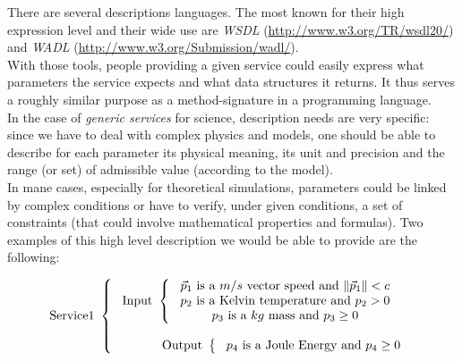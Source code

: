 \documentclass[a4paper,11pt] {article}
\begin{document}
There are several descriptions languages. The most known for their high expression level and their wide use are \emph{WSDL} (\href{http://www.w3.org/TR/wsdl20/}{http://www.w3.org/TR/wsdl20/}) and \textit{WADL} (\href{http://www.w3.org/Submission/wadl/}{http://www.w3.org/Submission/wadl/}).\\
With those tools, people providing a given service could easily express what parameters the service expects and what data structures it returns. It thus serves a roughly similar purpose as a method-signature in a programming language.\\

In the case of {\it generic services} for science, description needs are very specific: since we have to deal with complex physics and models, one should be able to describe for each parameter its physical meaning, its unit and precision and the range (or set) of admissible value (according to the model).\\ In mane cases, especially for theoretical simulations, parameters could be linked by complex conditions or have to verify, under given conditions, a set of constraints (that could involve mathematical properties and formulas). 
Two examples of this high level description we would be able to provide are the following:

\begin{equation}
\mbox{Service1 }\left\{
\begin{array}{l}
\ \mbox{Input } \left\{
\begin{array}{c}
 \mbox{$\vec p_1$ is a $m/s$ vector speed and $\| \vec p_1\|<c$} \\
 \mbox{ $p_2$ is a Kelvin temperature and $p_2>0$ }\\
 \mbox{$p_3$ is a $kg$ mass and $p_3\geq 0$}\\
\end{array}
\right. \\
\\
\ \mbox{\hspace{1cm} Output } \left\{
\begin{array}{l}
 \mbox{ $p_4$ is a Joule Energy and $p_4 \geq 0$} \\
 \end{array}
\right.\\
\end{array}
\right.
\end{equation}
\end{document}
